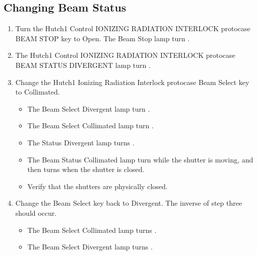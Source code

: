 \documentclass[letterpaper,10pt,english]{sphinxmanual}
\begin{document}
\subsection{Changing Beam Status}
\label{\detokenize{testing_documentation/Hutch-1_ionizing_radiation:changing-beam-status}}\begin{enumerate}
%
\item {} 
\sphinxAtStartPar
Turn the Hutch\sphinxhyphen{}1 Control IONIZING RADIATION INTERLOCK protocase BEAM STOP key to Open.
The Beam Stop lamp turn .

\item {} 
\sphinxAtStartPar
The Hutch\sphinxhyphen{}1 Control IONIZING RADIATION INTERLOCK protocase BEAM STATUS DIVERGENT lamp turn .

\item {} 
\sphinxAtStartPar
Change the Hutch\sphinxhyphen{}1 Ionizing Radiation Interlock protocase Beam Select key to Collimated.
\begin{itemize}
\item {} 
\sphinxAtStartPar
The Beam Select Divergent lamp turn .

\item {} 
\sphinxAtStartPar
The Beam Select Collimated lamp turn .

\item {} 
\sphinxAtStartPar
The Status Divergent lamp turns .

\item {} 
\sphinxAtStartPar
The Beam Status Collimated lamp turn  while the shutter is moving, and then turns  when the shutter is closed.

\item {} 
\sphinxAtStartPar
Verify that the shutters are physically closed.

\end{itemize}

\item {} 
\sphinxAtStartPar
Change the Beam Select key back to Divergent. The inverse of step three should occur.
\begin{itemize}
\item {} 
\sphinxAtStartPar
The Beam Select Collimated lamp turns .

\item {} 
\sphinxAtStartPar
The Beam Select Divergent lamp turns .


\end{itemize}
\end{enumerate}
\end{document}
